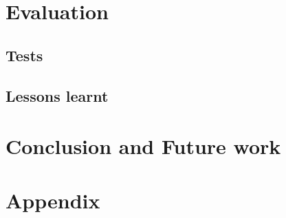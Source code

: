 \documentclass[a4paper,twocolumn]{article}
\begin{document}
\section{Evaluation}

\subsection{Tests}

\subsection{Lessons learnt}

\section{Conclusion and Future work}

\section{Appendix} %
\end{document}
